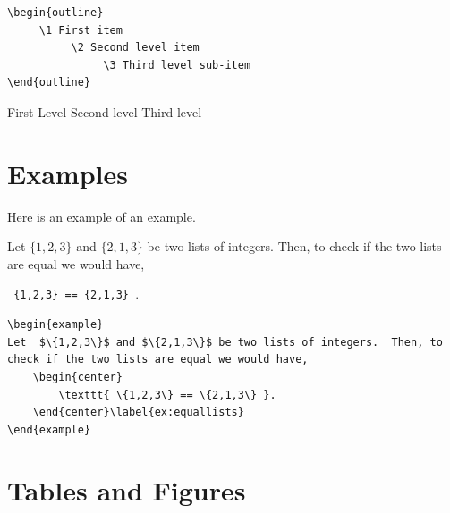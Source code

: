 \begin{verbatim}
\begin{outline}
     \1 First item
          \2 Second level item
               \3 Third level sub-item
\end{outline}
 \end{verbatim}
 
 \begin{outline}
 	\1 First Level
		\2 Second level
			\3 Third level
\end{outline}









\section{Examples}\label{ex:x1}
Here is an example of an example.


\begin{example}
Let  $\{1,2,3\}$ and $\{2,1,3\}$ be two lists of integers.  Then, to check if the two lists are equal we would have,   
	\begin{center}
		\texttt{ \{1,2,3\} == \{2,1,3\} }.
	\end{center}\label{ex:equallists}
\end{example}


\begin{verbatim}
\begin{example}
Let  $\{1,2,3\}$ and $\{2,1,3\}$ be two lists of integers.  Then, to check if the two lists are equal we would have,   
	\begin{center}
		\texttt{ \{1,2,3\} == \{2,1,3\} }.
	\end{center}\label{ex:equallists}
\end{example}
\end{verbatim}













%
%

\section{Tables and Figures}

